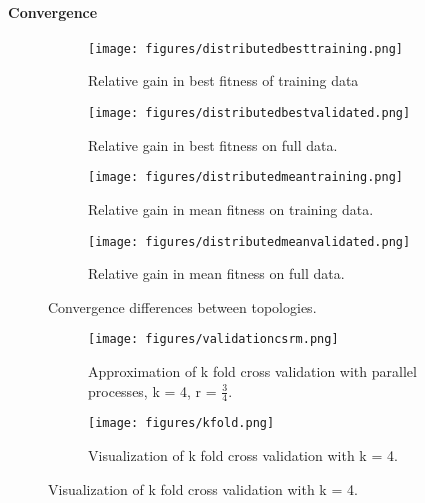 \paragraph{Convergence}
\begin{figure*}
    \centering
    \begin{subfigure}{0.5\textwidth}
    \centering
        \texttt{[image: figures/distributedbesttraining.png]}
        \caption{Relative gain in best fitness of training data}
    \end{subfigure}%
    \begin{subfigure}{0.5\textwidth}
    \centering
        \texttt{[image: figures/distributedbestvalidated.png]}
        \caption{Relative gain in best fitness on full data.}
    \end{subfigure}
        \begin{subfigure}{0.5\textwidth}
    \centering
        \texttt{[image: figures/distributedmeantraining.png]}
        \caption{Relative gain in mean fitness on training data.}
    \end{subfigure}%
    \begin{subfigure}{0.5\textwidth}
    \centering
        \texttt{[image: figures/distributedmeanvalidated.png]}
        \caption{Relative gain in mean fitness on full data.}
    \end{subfigure}
    \caption{Convergence differences between topologies.}
    \label{fig:distributedresults}
\end{figure*}

\begin{figure}
	\begin{subfigure}{0.5\textwidth}\label{fig:csrmkfold}
    \texttt{[image: figures/validationcsrm.png]}
    \caption{Approximation of k fold cross validation with parallel processes, k = 4,  r = $\frac{3}{4}$.}
    \end{subfigure}
	\begin{subfigure}{0.5\textwidth}    \label{fig:kfold}

    \centering
    \texttt{[image: figures/kfold.png]}
    \caption{Visualization of k fold cross validation with k = 4.}
    \end{subfigure}%
    \label{fig:ckfold}
 \end{figure}

